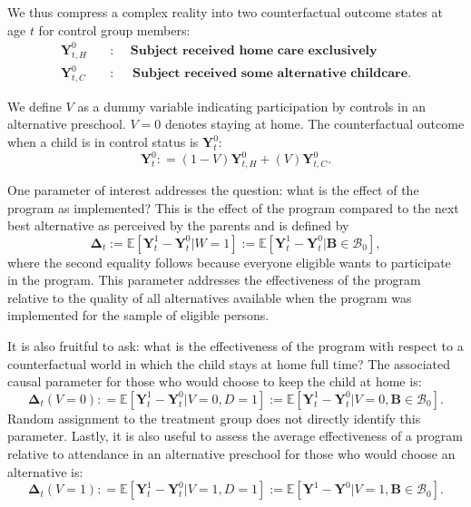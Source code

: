 We thus compress a complex reality into two counterfactual outcome states at age $t$ for control group members:
\begin{align*}
\bm{Y}_{t,H}^0 \quad &: \quad \textbf{ Subject received home care exclusively} \\
\bm{Y}_{t,C}^0 \quad &: \quad \textbf{ Subject received some alternative childcare}.
\end{align*}

We define $V$ as a dummy variable indicating participation by controls in an alternative preschool. $V=0$ denotes staying at home. The counterfactual outcome when a child is in control status is $\bm{Y}^0_t$:
\begin{equation}
\bm{Y}^0_t : = \left( 1 - V \right) \bm{Y}^0_{t,H} + \left( V \right) \bm{Y}^0_{t,C}.
\end{equation}

One parameter of interest addresses the question: what is the effect of the program as implemented? This is the effect of the program compared to the next best alternative as perceived by the parents and is defined by
\begin{equation}\label{eq:effect}
\bm{\Delta}_t := \mathbb{E} \left[ \bm{Y}^1_t -  \bm{Y}^0_t | W =1 \right] := \mathbb{E} \left[\bm{Y}^1_t - \bm{Y}^0_t | \bm{B} \in \mathcal{B}_0 \right],
\end{equation}
where the second equality follows because everyone eligible wants to participate in the program. This parameter addresses the effectiveness of the program relative to the quality of all alternatives available when the program was implemented for the sample of eligible persons.

It is also fruitful to ask: what is the effectiveness of the program with respect to a counterfactual world in which the child stays at home full time? The associated causal parameter for those who would choose to keep the child at home is:
\begin{equation}\label{eq:influenza}
\bm{\Delta}_t \left(V = 0 \right) : =   \mathbb{E} \left[ \bm{Y}^1_t - \bm{Y}^0_t | V = 0, D = 1 \right] := \mathbb{E} \left[\bm{Y}^1_t - \bm{Y}^0_t | V = 0, \bm{B} \in \mathcal{B}_0 \right].
\end{equation}
Random assignment to the treatment group does not directly identify this parameter. Lastly, it is also useful to assess the average effectiveness of a program relative to attendance in an alternative preschool for those who would choose an alternative is:
\begin{equation}\label{eq:smallpox}
\bm{\Delta}_t \left( V =1 \right) : =   \mathbb{E} \left[ \bm{Y}^1_t - \bm{Y}^0_t | V = 1, D = 1 \right] := \mathbb{E} \left[\bm{Y}^1 - \bm{Y}^0 | V = 1, \bm{B} \in \mathcal{B}_0 \right].
\end{equation}

